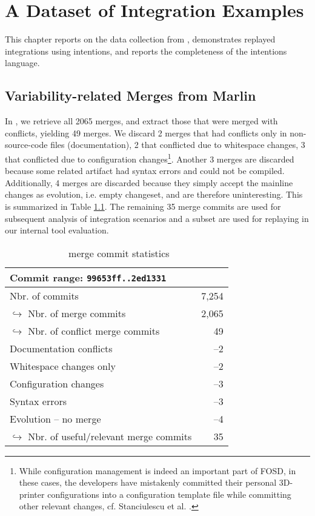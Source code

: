 \chapter{A Dataset of Integration Examples}
This chapter reports on the data collection from \marlin, demonstrates replayed integrations using intentions, and reports the completeness of the intentions language.

\section{Variability-related Merges from Marlin}\label{data-coll-res}
In \marlin, we retrieve all 2065 merges, and extract those that were merged with conflicts, yielding 49 merges. We discard 2 merges that had conflicts only in non-source-code files (documentation), 2 that conflicted due to whitespace changes, 3 that conflicted due to configuration changes\footnote{While configuration management is indeed an important part of FOSD, in these cases, the developers have mistakenly committed their personal 3D-printer configurations into a configuration template file while committing other relevant changes, cf. Stanciulescu et al. \cite{stanciulescu2015}.}. Another 3 merges are discarded because some related artifact had syntax errors and could not be compiled. Additionally, 4 merges are discarded because they simply accept the mainline changes as evolution, i.e. empty changeset, and are therefore uninteresting. This is summarized in Table \ref{tab:marlinmerge}. The remaining 35 merge commits are used for subsequent analysis of integration scenarios and a subset are used for replaying in our internal tool evaluation.

\begin{table}[h]
    \centering
    \caption{\marlin~merge commit statistics}
    \label{tab:marlinmerge}
    \begin{tabular}{l r}
    \hline\hline
        Commit range: \texttt{99653ff..2ed1331}& \\\hline
        Nbr. of commits & 7,254\\
        $\hookrightarrow$ Nbr. of merge commits & 2,065 \\
        \hspace{1em}$\hookrightarrow$ Nbr. of conflict merge commits & 49 \\
        \hspace{1em}Documentation conflicts & --2\\
        \hspace{1em}Whitespace changes only & --2\\
        \hspace{1em}Configuration changes & --3\\
        \hspace{1em}Syntax errors & --3\\
        \hspace{1em}Evolution -- no merge & --4\\
        \hspace{2em}$\hookrightarrow$ Nbr. of useful/relevant merge commits & 35\\
    \hline\hline
    \end{tabular}
\end{table}

